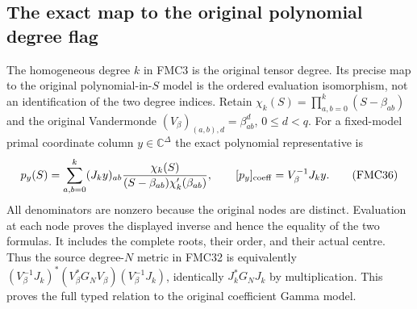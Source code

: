 \documentclass[11pt,a4paper]{article}
\begin{document}
\subsection{The exact map to the original polynomial degree flag}

The homogeneous degree $k$ in FMC3 is the original tensor degree.
Its precise map to the original polynomial-in-$S$ model is the
ordered evaluation isomorphism, not an identification of the two
degree indices. Retain
$\chi_k(S)=\prod_{a,b=0}^k(S-\beta_{ab})$ and the original
Vandermonde $(V_\beta)_{(a,b),d}=\beta_{ab}^d$, $0\le d<q$.
For a fixed-model primal coordinate column $y\in\mathbb C^\Delta$
the exact polynomial representative is
\[
 p_y(S)=\sum_{a,b=0}^k(J_ky)_{ab}
          \frac{\chi_k(S)}{(S-\beta_{ab})\chi_k'(\beta_{ab})},
 \qquad [p_y]_{\rm coeff}=V_\beta^{-1}J_ky.
 \tag{FMC36}
\]
All denominators are nonzero because the original nodes are
distinct. Evaluation at each node proves the displayed inverse
and hence the equality of the two formulas. It includes the
complete roots, their order, and their actual centre. Thus the
source degree-$N$ metric in FMC32 is equivalently
$(V_\beta^{-1}J_k)^*(V_\beta^*G_NV_\beta)
(V_\beta^{-1}J_k)$, identically $J_k^*G_NJ_k$ by multiplication.
This proves the full typed relation to the original coefficient
Gamma model.
\end{document}

